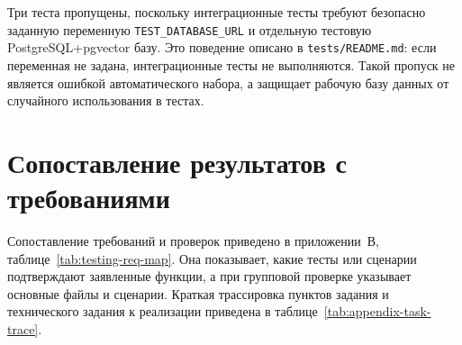 Три теста пропущены, поскольку интеграционные тесты требуют безопасно заданную переменную \texttt{TEST\_DATABASE\_URL} и отдельную тестовую PostgreSQL+pgvector базу. Это поведение описано в \texttt{tests/README.md}: если переменная не задана, интеграционные тесты не выполняются. Такой пропуск не является ошибкой автоматического набора, а защищает рабочую базу данных от случайного использования в тестах.

\section{Сопоставление результатов с требованиями}

Сопоставление требований и проверок приведено в приложении~В, таблице~\ref{tab:testing-req-map}. Она показывает, какие тесты или сценарии подтверждают заявленные функции, а при групповой проверке указывает основные файлы и сценарии. Краткая трассировка пунктов задания и технического задания к реализации приведена в таблице~\ref{tab:appendix-task-trace}.

